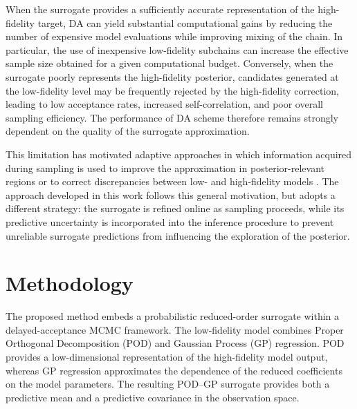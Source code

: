 \documentclass{elsarticle}
\begin{document}
When the surrogate provides a sufficiently accurate representation of the high-fidelity target, DA can yield substantial computational gains by reducing the number of expensive model evaluations while improving mixing of the chain. In particular, the use of inexpensive low-fidelity subchains can increase the effective sample size obtained for a given computational budget. Conversely, when the surrogate poorly represents the high-fidelity posterior, candidates generated at the low-fidelity level may be frequently rejected by the high-fidelity correction, leading to low acceptance rates, increased self-correlation, and poor overall sampling efficiency. The performance of DA scheme therefore remains strongly dependent on the quality of the surrogate approximation.

This limitation has motivated adaptive approaches in which information acquired during sampling is used to improve the approximation in posterior-relevant regions or to correct discrepancies between low- and high-fidelity models \cite{lykkegaard23}. The approach developed in this work follows this general motivation, but adopts a different strategy: the surrogate is refined online as sampling proceeds, while its predictive uncertainty is incorporated into the inference procedure to prevent unreliable surrogate predictions from influencing the exploration of the posterior.

\section{Methodology}
\label{sec:methodology}

The proposed method embeds a probabilistic reduced-order surrogate within a
delayed-acceptance MCMC framework. The low-fidelity model combines Proper
Orthogonal Decomposition (POD) and Gaussian Process (GP) regression. POD
provides a low-dimensional representation of the high-fidelity model output,
whereas GP regression approximates the dependence of the reduced coefficients
on the model parameters. The resulting POD–GP surrogate provides both a
predictive mean and a predictive covariance in the observation space.
\end{document}
